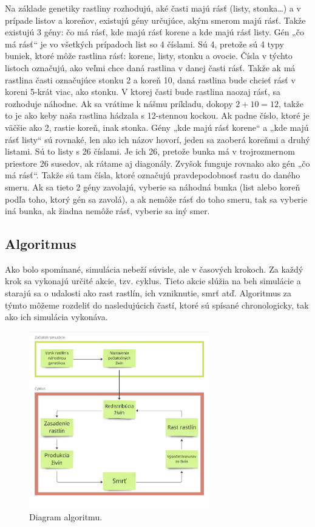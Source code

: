 \documentclass[12pt]{article}
\begin{document}
Na základe genetiky rastliny rozhodujú, aké časti majú rásť (listy, stonka…)
a v prípade listov a koreňov, existujú gény určujúce, akým smerom majú rásť.
Takže existujú 3 gény: čo má rásť, kde majú rásť korene a kde majú rásť listy.
Gén „čo má rásť“ je vo všetkých prípadoch list so 4 číslami. Sú 4, pretože sú 4
typy buniek, ktoré môže rastlina rásť: korene, listy, stonku a ovocie. Čísla
v týchto listoch označujú, ako veľmi chce daná rastlina v danej časti rásť. Takže
ak má rastlina časti označujúce stonku 2 a koreň 10, daná rastlina bude
chcieť rásť v koreni 5-krát viac, ako stonku. V ktorej časti bude rastlina naozaj
rásť, sa rozhoduje náhodne. Ak sa vrátime k nášmu príkladu, dokopy $2+10=12$,
takže to je ako keby naša rastlina hádzala s 12-stennou kockou. Ak padne číslo,
ktoré je väčšie ako 2, rastie koreň, inak stonka. Gény „kde majú rásť korene“
a „kde majú rásť listy“ sú rovnaké, len ako ich názov hovorí, jeden sa zaoberá
koreňmi a druhý listami. Sú to listy s 26 číslami. Je ich 26, pretože bunka má
v trojrozmernom priestore 26 susedov, ak rátame aj diagonály. Zvyšok funguje
rovnako ako gén „čo má rásť“. Takže sú tam čísla, ktoré označujú
pravdepodobnosť rastu do daného smeru. Ak sa tieto 2 gény zavolajú, vyberie
sa náhodná bunka (list alebo koreň podľa toho, ktorý gén sa zavolá), a ak
nemôže rásť do toho smeru, tak sa vyberie iná bunka, ak žiadna nemôže rásť,
vyberie sa iný smer.

\newpage
\subsection{Algoritmus}

Ako bolo spomínané, simulácia nebeží súvisle, ale v časových krokoch.
Za každý krok sa vykonajú určité akcie, tzv. cyklus. Tieto akcie slúžia na beh
simulácie a starajú sa o udalosti ako rast rastlín, ich vzniknutie, smrť atď.
Algoritmus za týmto môžeme rozdeliť do nasledujúcich častí, ktoré sú spísané
chronologicky, tak ako ich simulácia vykonáva.

\begin{figure}[ht]
	\centering
	\includegraphics[width=0.7\textwidth]{res/diagram_algoritmu.png}
	\caption{Diagram algoritmu.}
\end{figure}
\end{document}
